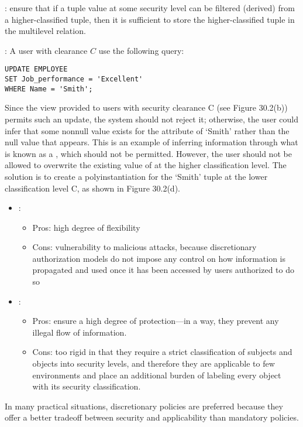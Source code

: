   \par {}: ensure that if a tuple value at some security level can be filtered (derived) from a higher-classified tuple, then it is sufficient to store the higher-classified tuple in the multilevel relation.


  \par {}: A user with clearance $C$ use the following query:

\begin{verbatim}
UPDATE EMPLOYEE
SET Job_performance = 'Excellent'
WHERE Name = 'Smith';
\end{verbatim}

  \par Since the view provided to users with security clearance C (see Figure 30.2(b)) permits such an update, the system should not reject it; otherwise, the user could infer that some nonnull value exists for the  attribute of `Smith' rather than the null value that appears. This is an example of inferring information through what is known as a , which should not be permitted. However, the user should not be allowed to overwrite the existing value of  at the higher classification level. The solution is to create a polyinstantiation for the ‘Smith’ tuple at the lower classification level C, as shown in Figure 30.2(d).

    \begin{itemize}
      \item {}:
        \begin{itemize}
          \item Pros: high degree of flexibility
          \item Cons: vulnerability to malicious attacks, because discretionary authorization models do not impose any control on how information is propagated and used once it has been accessed by users authorized to do so
        \end{itemize}
      \item {}:
        \begin{itemize}
          \item Pros: ensure a high degree of protection—in a way, they prevent any illegal flow of information.
          \item Cons: too rigid in that they require a strict classification of subjects and objects into security levels, and therefore they are applicable to few environments and place an additional burden of labeling every object with its security classification.
        \end{itemize}
    \end{itemize}
    \par In many practical situations, discretionary policies are preferred because they offer a better tradeoff between security and applicability than mandatory policies.

